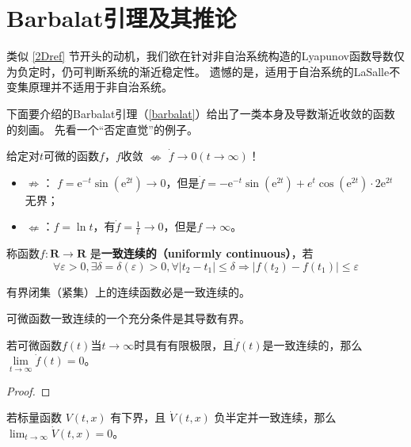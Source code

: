 \section{Barbalat引理及其推论}\label{3Eref}
类似 \ref{2Dref} 节开头的动机，我们欲在针对非自治系统构造的Lyapunov函数导数仅为负定时，仍可判断系统的渐近稳定性。
遗憾的是，适用于自治系统的LaSalle不变集原理并不适用于非自治系统。

下面要介绍的Barbalat引理（\ref{barbalat}）给出了一类本身及导数渐近收敛的函数的刻画。
先看一个“否定直觉”的例子。
\begin{example}
    给定对$t$可微的函数$f$，$f$收敛  $\nLeftrightarrow $ $\dot{f} \rightarrow 0 (t \rightarrow \infty)$！
  \begin{itemize}[leftmargin=1em]
    \item $\nRightarrow $： $f = \mathrm{e}^{- t} \sin (\mathrm{e}^{2 t}) \rightarrow 0$，但是$ \dot{f} = - \mathrm{e}^{- t} \sin
    (\mathrm{e}^{2 t}) + e^t \cos (\mathrm{e}^{2 t}) \cdot 2 \mathrm{e}^{2 t}$ 无界；
    
    \item $\nLeftarrow $：$f = \ln  t$，有$ \dot{f} = \frac{1}{t} \rightarrow0$，但是$f \rightarrow \infty$。
  \end{itemize}
\end{example}
\begin{definition}
    称函数$f : \mathbf{R} \rightarrow \mathbf{R}$ 是{\bf 一致连续的（uniformly continuous）}，若
     \[\forall \varepsilon > 0, \exists \delta
  = \delta (\varepsilon) > 0, \forall | t_2 - t_1 | \leq \delta \Rightarrow |
  f (t_2) - f (t_1) | \leq \varepsilon\]
\end{definition}
\begin{lemma}
    有界闭集（紧集）上的连续函数必是一致连续的。
\end{lemma}
\begin{lemma}
    可微函数一致连续的一个充分条件是其导数有界。
\end{lemma}
\begin{theorem}[Barbalat引理]\label{barbalat}
    若可微函数$f(t)$当$t\to\infty$时具有有限极限，且$\dot{f}(t)$是一致连续的，那么$\lim\limits_{t\to\infty}\dot{f}(t)=0$。
\end{theorem}
\begin{proof}
    
\end{proof}
\begin{theorem}
  若标量函数 $V(t, x)$ 有下界，且 $\dot{V}(t, x)$ 负半定并一致连续，那么 $\lim_{t \to \infty} \dot{V}(t, x) = 0$。
\end{theorem}
